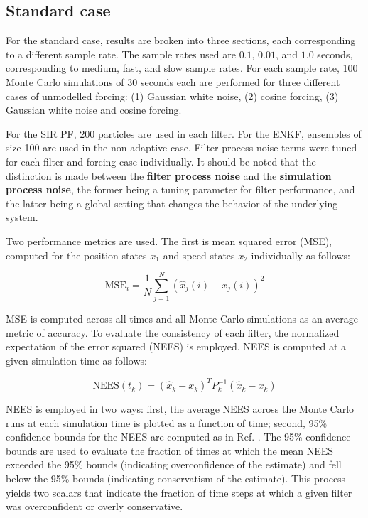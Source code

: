 \documentclass[]{article}
\begin{document}
\subsection{Standard case}

For the standard case, results are broken into three sections, each corresponding to a different sample rate. The sample rates used are $0.1$, $0.01$, and $1.0$ seconds, corresponding to medium, fast, and slow sample rates. For each sample rate, 100 Monte Carlo simulations of 30 seconds each are performed for three different cases of unmodelled forcing: (1) Gaussian white noise, (2) cosine forcing, (3) Gaussian white noise and cosine forcing.

For the SIR PF, 200 particles are used in each filter. For the ENKF, ensembles of size 100 are used in the non-adaptive case. Filter process noise terms were tuned for each filter and forcing case individually. It should be noted that the distinction is made between the \textbf{filter process noise} and the \textbf{simulation process noise}, the former being a tuning parameter for filter performance, and the latter being a global setting that changes the behavior of the underlying system.

Two performance metrics are used. The first is mean squared error (MSE), computed for the position states $x_1$ and speed states $x_2$ individually as follows:

\begin{equation}
\mathrm{MSE}_i = \frac{1}{N} \sum_{j=1}^N (\hat{x}_j(i) - x_j(i))^2
\end{equation}

MSE is computed across all times and all Monte Carlo simulations as an average metric of accuracy. To evaluate the consistency of each filter, the normalized expectation of the error squared (NEES) is employed. NEES is computed at a given simulation time as follows:

\begin{equation}
\mathrm{NEES}(t_k) = (\hat{x}_k-x_k)^T P_k^{-1} (\hat{x}_k-x_k)
\end{equation}

NEES is employed in two ways: first, the average NEES across the Monte Carlo runs at each simulation time is plotted as a function of time; second, 95\% confidence bounds for the NEES are computed as in Ref. \cite{neesPaper}. The 95\% confidence bounds are used to evaluate the fraction of times at which the mean NEES exceeded the 95\% bounds (indicating overconfidence of the estimate) and fell below the 95\% bounds (indicating conservatism of the estimate). This process yields two scalars that indicate the fraction of time steps at which a given filter was overconfident or overly conservative.
\end{document}
